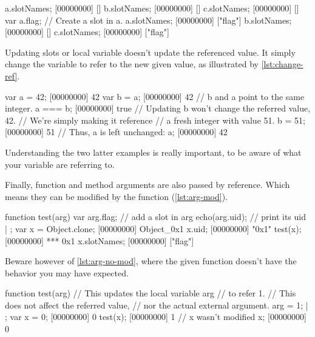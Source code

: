 \begin{urbiscript}[caption=Shared modification,
  label=lst:same-ref-mod, name=same]
a.slotNames;
[00000000] []
b.slotNames;
[00000000] []
c.slotNames;
[00000000] []
var a.flag; // Create a slot in a.
a.slotNames;
[00000000] ["flag"]
b.slotNames;
[00000000] []
c.slotNames;
[00000000] ["flag"]
\end{urbiscript}

Updating slots or local variable doesn't update the referenced
value. It simply change the variable to refer to the new given value,
as illustrated by \autoref{lst:change-ref}.

\begin{urbiscript}[caption=Updates just change the referee,
  label=lst:change-ref]
var a = 42;
[00000000] 42
var b = a;
[00000000] 42
// b and a point to the same integer.
a === b;
[00000000] true
// Updating b won't change the referred value, 42.
// We're simply making it reference
// a fresh integer with value 51.
b = 51;
[00000000] 51
// Thus, a is left unchanged:
a;
[00000000] 42
\end{urbiscript}

Understanding the two latter examples is really important, to be aware
of what your variable are referring to.

Finally, function and method arguments are also passed by
reference. Which means they can be modified by the function
(\autoref{lst:arg-mod}).

\begin{urbiscript}[caption=Function modifying its argument,
label=lst:arg-mod]
function test(arg)
{
  var arg.flag;  // add a slot in arg
  echo(arg.uid); // print its uid
} | {};
var x = Object.clone;
[00000000] Object_0x1
x.uid;
[00000000] "0x1"
test(x);
[00000000] *** 0x1
x.slotNames;
[00000000] ["flag"]
\end{urbiscript}

Beware however of \autoref{lst:arg-no-mod}, where the given function doesn't
have the behavior you may have expected.

\begin{urbiscript}[caption=Function failing to modify its argument,
label=lst:arg-no-mod]
function test(arg)
{
  // This updates the local variable arg
  // to refer 1.
  // This does not affect the referred value,
  // nor the actual external argument.
  arg = 1;
} | {};
var x = 0;
[00000000] 0
test(x);
[00000000] 1
// x wasn't modified
x;
[00000000] 0
\end{urbiscript}

